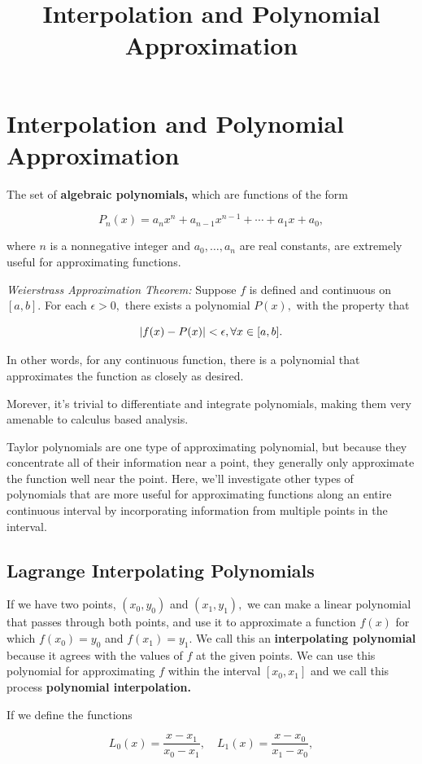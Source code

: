 \documentclass{article}
\title{Interpolation and Polynomial Approximation}
\begin{document}
\section{Interpolation and Polynomial Approximation}

The set of \textbf{algebraic polynomials,} which are functions of the form

\[ P_n(x) = a_n x^n + a_{n-1}x^{n-1} + \cdots + a_1 x + a_0, \]

where $n$ is a nonnegative \@{integer} and $a_0,\dots,a_n$ are real constants, are extremely useful for approximating functions.

\emph{Weierstrass Approximation Theorem:} Suppose $f$ is defined and \@{continuous} on $[a,b].$ For each $\epsilon > 0,$ there exists a polynomial $P(x),$ with the property that

\[ \left| f(x) - P(x) \right| < \epsilon, \forall x \in [a,b]. \] 

In other words, for any \@{continuous} function, there is a polynomial that approximates the function as closely as desired.

Morever, it's trivial to differentiate and integrate polynomials, making them very amenable to calculus based analysis.

Taylor polynomials are one type of approximating polynomial, but because they concentrate all of their information near a point, they generally only approximate the function well near the point. Here, we'll investigate other types of polynomials that are more useful for approximating functions along an entire continuous interval by incorporating information from multiple points in the interval.

\subsection{Lagrange Interpolating Polynomials}

If we have two points, $(x_0, y_0)$ and $(x_1, y_1),$ we can make a linear polynomial that passes through both points, and use it to approximate a function $f(x)$ for which $f(x_0) = y_0$ and $f(x_1) = y_1.$ We call this an \textbf{interpolating polynomial} because it agrees with the values of $f$ at the given points. We can use this polynomial for approximating $f$ within the interval $[x_0, x_1]$ and we call this process \textbf{polynomial interpolation.}

If we define the functions

\[ L_0(x) = \frac{x - x_1}{x_0 - x_1}, \quad L_1(x) = \frac{x - x_0}{x_1 - x_0}, \]
\end{document}
